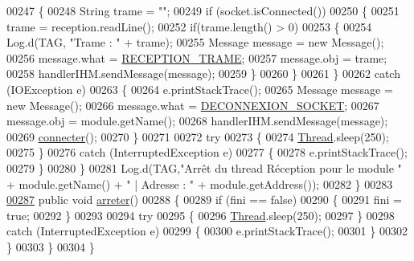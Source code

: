 \begin{DoxyCode}
00247                 \{
00248                     String trame = \textcolor{stringliteral}{""};
00249                     \textcolor{keywordflow}{if} (socket.isConnected())
00250                     \{
00251                         trame = reception.readLine();
00252                         \textcolor{keywordflow}{if}(trame.length() > 0)
00253                         \{
00254                           Log.d(TAG, \textcolor{stringliteral}{"Trame : "} + trame);
00255                           Message message = \textcolor{keyword}{new} Message();
00256                           message.what = \hyperlink{classcom_1_1example_1_1area_1_1_liaison_bluetooth_a1a3058c683cec15fe0f3699f7fc26073}{RECEPTION\_TRAME};
00257                           message.obj = trame;
00258                           handlerIHM.sendMessage(message);
00259                         \}
00260                     \}
00261                 \}
00262                 \textcolor{keywordflow}{catch} (IOException e)
00263                 \{
00264                     e.printStackTrace();
00265                     Message message = \textcolor{keyword}{new} Message();
00266                     message.what = \hyperlink{classcom_1_1example_1_1area_1_1_liaison_bluetooth_a8ff08468d7b2cead9c3714c665f75d0e}{DECONNEXION\_SOCKET};
00267                     message.obj = module.getName();
00268                     handlerIHM.sendMessage(message);
00269                     \hyperlink{classcom_1_1example_1_1area_1_1_liaison_bluetooth_a7b9662a4224762b23c814d1f4539002a}{connecter}();
00270                 \}
00271 
00272                 \textcolor{keywordflow}{try}
00273                 \{
00274                     \hyperlink{class_thread}{Thread}.sleep(250);
00275                 \}
00276                 \textcolor{keywordflow}{catch} (InterruptedException e)
00277                 \{
00278                     e.printStackTrace();
00279                 \}
00280             \}
00281             Log.d(TAG,\textcolor{stringliteral}{"Arrêt du thread Réception pour le module "} + module.getName() + \textcolor{stringliteral}{" | Adresse : "} + 
      module.getAddress());
00282         \}
00283 
\hyperlink{classcom_1_1example_1_1area_1_1_liaison_bluetooth_1_1_t_reception_a89f97f22a976b8632e82b2aa94ab2674}{00287}         \textcolor{keyword}{public} \textcolor{keywordtype}{void} \hyperlink{classcom_1_1example_1_1area_1_1_liaison_bluetooth_1_1_t_reception_a89f97f22a976b8632e82b2aa94ab2674}{arreter}()
00288         \{
00289             \textcolor{keywordflow}{if} (fini == \textcolor{keyword}{false})
00290             \{
00291                 fini = \textcolor{keyword}{true};
00292             \}
00293 
00294             \textcolor{keywordflow}{try}
00295             \{
00296                 \hyperlink{class_thread}{Thread}.sleep(250);
00297             \}
00298             \textcolor{keywordflow}{catch} (InterruptedException e)
00299             \{
00300                 e.printStackTrace();
00301             \}
00302         \}
00303     \}
00304 \}
\end{DoxyCode}
